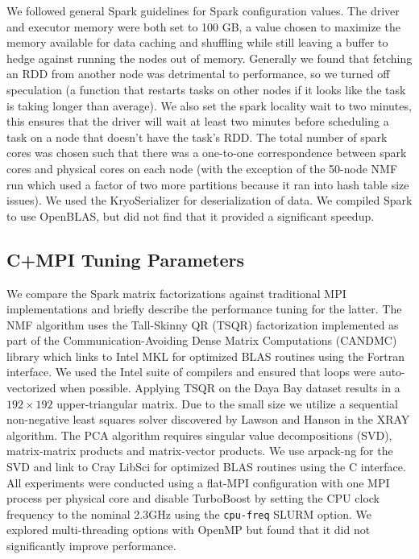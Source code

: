 We followed general Spark guidelines for Spark configuration values. The driver and executor memory were both set to 100 GB, a value chosen to maximize the memory available for data caching and shuffling while still leaving a buffer to hedge against running the nodes out of memory.  Generally we found that fetching an RDD from another node was detrimental to performance, so we turned off speculation (a function that restarts tasks on other nodes if it looks like the task is taking longer than average). We also set the spark locality wait to two minutes, this ensures that the driver will wait at least two minutes before scheduling a task on a node that doesn't have the task's RDD. The total number of spark cores was chosen such that there was a one-to-one correspondence between spark cores and physical cores on each node (with the exception of the 50-node NMF run which used a factor of two more partitions because it ran into hash table size issues). We used the KryoSerializer for deserialization of data. We compiled Spark to use OpenBLAS, but did not find that it provided a significant speedup.

\subsection{C+MPI Tuning Parameters}
We compare the Spark matrix factorizations against traditional MPI implementations and briefly describe the performance tuning for the latter. The NMF algorithm uses the Tall-Skinny QR (TSQR) \cite{ballard14, Demmel12} factorization implemented as part of the Communication-Avoiding Dense Matrix Computations (CANDMC) library \cite{Solomonik14} which links to Intel MKL for optimized BLAS routines using the Fortran interface. We used the Intel suite of compilers and ensured that loops were auto-vectorized when possible. Applying TSQR on the Daya Bay dataset results in a $192 \times 192$ upper-triangular matrix. Due to the small size we utilize a sequential non-negative least squares solver discovered by Lawson and Hanson \cite{lawson95} in the XRAY algorithm. The PCA algorithm requires singular value decompositions (SVD), matrix-matrix products and matrix-vector products. We use arpack-ng \cite{Lehoucq97} for the SVD and link to Cray LibSci for optimized BLAS routines using the C interface. All experiments were conducted using a flat-MPI configuration with one MPI process per physical core and disable TurboBoost by setting the CPU clock frequency to the nominal 2.3GHz using the \verb+cpu-freq+ SLURM option. We explored multi-threading options with OpenMP but found that it did not significantly improve performance.